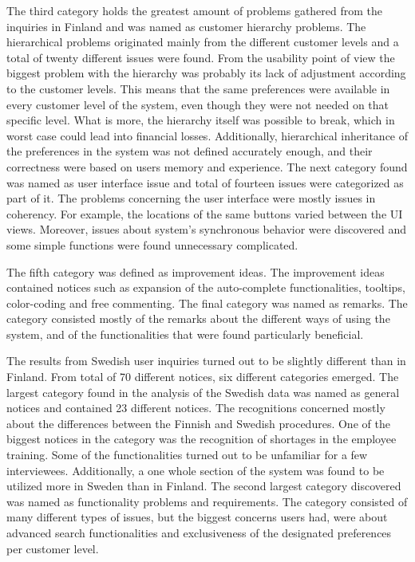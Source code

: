\documentclass[12pt,a4paper,oneside,pdftex]{report}
\begin{document}
The third category holds the greatest amount of problems gathered from the inquiries in Finland and was named as customer hierarchy problems. The hierarchical problems originated mainly from the different customer levels and a total of twenty different issues were found. From the usability point of view the biggest problem with the hierarchy was probably its lack of adjustment according to the customer levels. This means that the same preferences were available in every customer level of the system, even though they were not needed on that specific level. What is more, the hierarchy itself was possible to break, which in worst case could lead into financial losses. Additionally, hierarchical inheritance of the preferences in the system was not defined accurately enough, and their correctness were based on users memory and experience. The next category found was named as user interface issue and total of fourteen issues were categorized as part of it. The problems concerning the user interface were mostly issues in coherency. For example, the locations of the same buttons varied between the UI views. Moreover, issues about system's synchronous behavior were discovered and some simple functions were found unnecessary complicated.

The fifth category was defined as improvement ideas. The improvement ideas contained notices such as expansion of the auto-complete functionalities, tooltips, color-coding and free commenting. The final category was named as remarks. The category consisted mostly of the remarks about the different ways of using the system, and of the functionalities that were found particularly beneficial.   
    
The results from Swedish user inquiries turned out to be slightly different than in Finland. From total of 70 different notices, six different categories emerged. The largest category found in the analysis of the Swedish data was named as general notices and contained 23 different notices. The recognitions concerned mostly about the differences between the Finnish and Swedish procedures. One of the biggest notices in the category was the recognition of shortages in the employee training. Some of the functionalities turned out to be unfamiliar for a few interviewees. Additionally, a one whole section of the system was found to be utilized more in Sweden than in Finland. The second largest category discovered was named as functionality problems and requirements. The category consisted of many different types of issues, but the biggest concerns users had, were about advanced search functionalities and exclusiveness of the designated preferences per customer level. 
\end{document}
